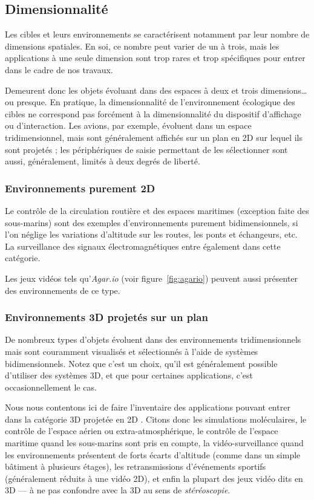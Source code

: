 	\subsection{Dimensionnalité}
	Les cibles et leurs environnements se caractérisent notamment par leur nombre de dimensions spatiales. En soi, ce nombre peut varier de un à trois, mais les applications à une seule dimension sont trop rares et trop spécifiques pour entrer dans le cadre de nos travaux.
	
	Demeurent donc les objets évoluant dans des espaces à deux et trois dimensions\ldots{} ou presque. En pratique, la dimensionnalité de l'environnement \og écologique \fg{} des cibles ne correspond pas forcément à la dimensionnalité du dispositif d'affichage ou d'interaction. Les avions, par exemple, évoluent dans un espace tridimensionnel, mais sont généralement affichés sur un plan en 2D sur lequel ils sont projetés ; les périphériques de saisie permettant de les sélectionner sont aussi, généralement, limités à deux degrés de liberté.
	
	\subsubsection{Environnements purement 2D}
	Le contrôle de la circulation routière et des espaces maritimes (exception faite des sous-marins) sont des exemples d'environnements purement bidimensionnels, si l'on néglige les variations d'altitude sur les routes, les ponts et échangeurs, etc. La surveillance des signaux électromagnétiques entre également dans cette catégorie.
	
	Les jeux vidéos tels qu'\emph{Agar.io} (voir figure~\ref{fig:agario}) peuvent aussi présenter des environnements de ce type.
	
	\subsubsection{Environnements 3D projetés sur un plan}
	De nombreux types d'objets évoluent dans des environnements tridimensionnels mais sont couramment visualisés et sélectionnés à l'aide de systèmes bidimensionnels. Notez que c'est un choix, qu'il est généralement possible d'utiliser des systèmes 3D, et que pour certaines applications, c'est occasionnellement le cas.
	
	Nous nous contentons ici de faire l'inventaire des applications pouvant entrer dans la catégorie \og 3D projetée en 2D \fg{}. Citons donc les simulations moléculaires, le contrôle de l'espace aérien ou extra-atmosphérique, le contrôle de l'espace maritime quand les sous-marins sont pris en compte, la vidéo-surveillance quand les environnements présentent de forts écarts d'altitude (comme dans un simple bâtiment à plusieurs étages), les retransmissions d'événements sportifs (généralement réduits à une vidéo 2D), et enfin la plupart des jeux vidéo dits \og en 3D \fg{} --- à ne pas confondre avec la 3D au sens de \emph{stéréoscopie}.
	
